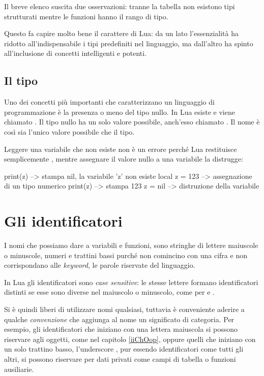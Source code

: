 Il breve elenco suscita due osservazioni: tranne la tabella non esistono
tipi strutturati mentre le funzioni hanno il rango di tipo.

Questo fa capire molto bene il carattere di Lua: da un lato l'essenzialità ha
ridotto all'indispensabile i tipi predefiniti nel linguaggio, ma dall'altro ha
spinto all'inclusione di concetti intelligenti e potenti.


\subsection{Il tipo }
\label{iiSecTipoNil}

Uno dei concetti più importanti che caratterizzano un linguaggio di
programmazione è la presenza o meno del tipo nullo. In Lua esiste e viene
chiamato . Il tipo nullo ha un solo valore possibile,
anch'esso chiamato . Il nome è così sia l'unico valore possibile che il
tipo.

Leggere una variabile che non esiste non è un errore perché Lua restituisce
semplicemente , mentre assegnare il valore nullo a una variabile la
distrugge:
\begin{lines}
print(z)      --> stampa nil, la variabile 'z' non esiste
local z = 123 --> assegnazione di un tipo numerico
print(z)      --> stampa 123
z = nil       --> distruzione della variabile
\end{lines}


\section{Gli identificatori}

I nomi che possiamo dare a variabili e funzioni, sono stringhe di lettere
maiuscole o minuscole, numeri e trattini bassi \luas{\_} purché non
comincino con una cifra e non corrispondano alle \emph{keyword}, le parole
riservate del linguaggio.

In Lua gli identificatori sono \emph{case sensitive}: le stesse lettere formano
identificatori distinti se esse sono diverse nel maiuscolo o minuscolo, come per
 e .

Si è quindi liberi di utilizzare nomi qualsiasi, tuttavia è conveniente aderire
a qualche \emph{convenzione} che aggiunga al nome un significato di categoria.
Per esempio, gli identificatori che iniziano con una lettera maiuscola si
possono riservare agli oggetti, come nel capitolo \ref{iiChOop}, oppure quelli
che iniziano con un solo trattino basso, l'underscore , pur essendo
identificatori come tutti gli altri, si possono riservare per dati privati come
campi di tabella o funzioni ausiliarie.

